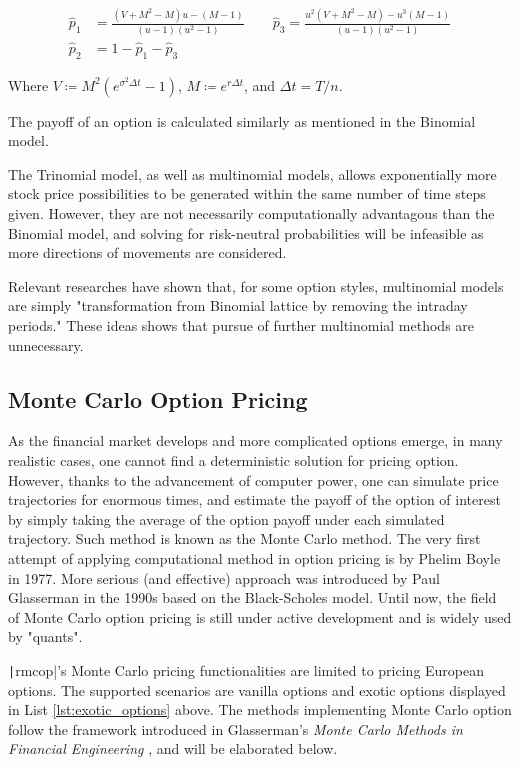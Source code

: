 
\begin{align}
\hat{p}_1&=\frac{(V + M^2 - M) u - (M - 1)}{(u - 1)(u^2 - 1)}\qquad\hat{p}_3=\frac{u^2(V + M^2 - M) - u^3(M - 1)}{(u - 1)(u^2 - 1)} \\
\hat{p}_2&=1-\hat{p}_1-\hat{p}_3
\end{align}

Where $V\coloneqq M^2(e^{\sigma^2\Delta t} - 1)$, $M\coloneqq e^{r\Delta t}$, and $\Delta t=T/n$.

The payoff of an option is calculated similarly as mentioned in the Binomial model.

The Trinomial model, as well as multinomial models, allows exponentially more stock price possibilities to be generated within the same number of time steps given. However, they are not necessarily computationally advantagous than the Binomial model, and solving for risk-neutral probabilities will be infeasible as more directions of movements are considered.

Relevant researches\cite{SI2019} have shown that, for some option styles, multinomial models are simply "transformation from Binomial lattice by removing the intraday periods." These ideas shows that pursue of further multinomial methods are unnecessary.

\subsection{Monte Carlo Option Pricing}

As the financial market develops and more complicated options emerge, in many realistic cases, one cannot find a deterministic solution for pricing option. However, thanks to the advancement of computer power, one can simulate price trajectories for enormous times, and estimate the payoff of the option of interest by simply taking the average of the option payoff under each simulated trajectory. Such method is known as the Monte Carlo method. The very first attempt of applying computational method in option pricing is by Phelim Boyle in 1977. More serious (and effective) approach was introduced by Paul Glasserman \cite{Glasserman2003} in the 1990s based on the Black-Scholes model. Until now, the field of Monte Carlo option pricing is still under active development and is widely used by "quants".

\texttt|rmcop|'s Monte Carlo pricing functionalities are limited to pricing European options. The supported scenarios are vanilla options and exotic options displayed in List \ref{lst:exotic_options} above. The methods implementing Monte Carlo option follow the framework introduced in Glasserman's \textit{Monte Carlo Methods in Financial Engineering} \cite{Glasserman2003}, and will be elaborated below.

